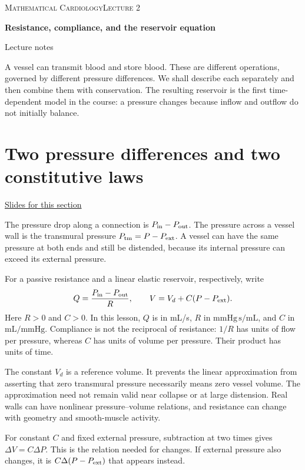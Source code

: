 \documentclass[11pt,letterpaper]{article}
\theoremstyle{definition}\newtheorem{definition}{Definition}\newtheorem{example}{Example}
\numberwithin{equation}{section}
\begin{document}
{\small\scshape Mathematical Cardiology\hfill Lecture 2}\par\medskip
{\raggedright{}\LARGE\bfseries\color{ink} Resistance, compliance, and the reservoir equation\par}\medskip
{\small Lecture notes}\par\bigskip
A vessel can transmit blood and store blood. These are different operations, governed by different pressure differences. We shall describe each separately and then combine them with conservation. The resulting reservoir is the first time-dependent model in the course: a pressure changes because inflow and outflow do not initially balance.

\section{Two pressure differences and two constitutive laws}
\hypertarget{note-two-pressure-differences-and-two-constitutive-laws}{}\label{note:two-pressure-differences-and-two-constitutive-laws}
{\small \href{slides.html\#frame=transmission-and-storage\&step=1}{Slides for this section}}\par
The pressure drop along a connection is $P_{\rm in}-P_{\rm out}$. The pressure across a vessel wall is the transmural pressure $P_{\rm tm}=P-P_{\rm ext}$. A vessel can have the same pressure at both ends and still be distended, because its internal pressure can exceed its external pressure.

For a passive resistance and a linear elastic reservoir, respectively, write
\begin{equation}
Q=\frac{P_{\rm in}-P_{\rm out}}{R},\qquad
V=V_d+C(P-P_{\rm ext}).
\end{equation}
Here $R>0$ and $C>0$. In this lesson, $Q$ is in mL/s, $R$ in $\mathrm{mmHg\,s/mL}$, and $C$ in $\mathrm{mL/mmHg}$. Compliance is not the reciprocal of resistance: $1/R$ has units of flow per pressure, whereas $C$ has units of volume per pressure. Their product has units of time.

The constant $V_d$ is a reference volume. It prevents the linear approximation from asserting that zero transmural pressure necessarily means zero vessel volume. The approximation need not remain valid near collapse or at large distension. Real walls can have nonlinear pressure--volume relations, and resistance can change with geometry and smooth-muscle activity.

For constant $C$ and fixed external pressure, subtraction at two times gives $\Delta V=C\Delta P$. This is the relation needed for changes. If external pressure also changes, it is $C\Delta(P-P_{\rm ext})$ that appears instead.
\end{document}

